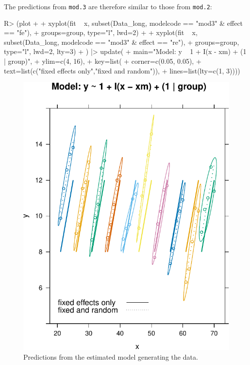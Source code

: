 \documentclass[
]{jss}
\begin{document}
The predictions from \texttt{mod.3} are therefore similar to those from
\texttt{mod.2}:

\begin{CodeChunk}
\begin{CodeInput}
R> (plot +
+   xyplot(fit ~ x, subset(Data_long, modelcode == "mod3" & effect == "fe"),
+          groups=group, type="l", lwd=2) +
+   xyplot(fit ~ x, subset(Data_long, modelcode == "mod3" & effect == "re"),
+          groups=group, type="l", lwd=2, lty=3)
+ ) |> update(
+   main="Model: y ~ 1 + I(x - xm) + (1 | group)",
+   ylim=c(4, 16),
+   key=list(
+     corner=c(0.05, 0.05),
+     text=list(c("fixed effects only","fixed and random")),
+     lines=list(lty=c(1, 3))))
\end{CodeInput}
\begin{figure}

{\centering \includegraphics[width=1\linewidth]{JSS-article_files/figure-latex/plot-fits-mod3-1} 

}

\caption[Predictions from the estimated model generating the data]{Predictions from the estimated model generating the data.}\label{fig:plot-fits-mod3}
\end{figure}
\end{CodeChunk}
\end{document}
